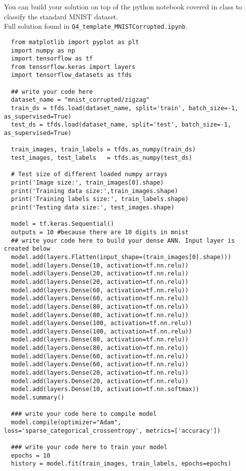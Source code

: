 \item You can build your solution on top of the python notebook covered in class to classify the
standard MNIST dataset.\\[5pt]
Full solution found in \lstinline{Q4_template_MNISTCorrupted.ipynb}.
\begin{lstlisting}
  from matplotlib import pyplot as plt
  import numpy as np
  import tensorflow as tf
  from tensorflow.keras import layers
  import tensorflow_datasets as tfds

  ## write your code here
  dataset_name = "mnist_corrupted/zigzag"
  train_ds = tfds.load(dataset_name, split='train', batch_size=-1, as_supervised=True)
  test_ds = tfds.load(dataset_name, split='test', batch_size=-1, as_supervised=True)

  train_images, train_labels = tfds.as_numpy(train_ds)
  test_images, test_labels   = tfds.as_numpy(test_ds)

  # Test size of different loaded numpy arrays
  print('Image size:', train_images[0].shape)
  print('Training data size:',train_images.shape)
  print('Training labels size:', train_labels.shape)
  print('Testing data size:', test_images.shape)

  model = tf.keras.Sequential()
  outputs = 10 #because there are 10 digits in mnist
  ## write your code here to build your dense ANN. Input layer is created below
  model.add(layers.Flatten(input_shape=(train_images[0].shape)))
  model.add(layers.Dense(10, activation=tf.nn.relu))
  model.add(layers.Dense(20, activation=tf.nn.relu))
  model.add(layers.Dense(20, activation=tf.nn.relu))
  model.add(layers.Dense(60, activation=tf.nn.relu))
  model.add(layers.Dense(60, activation=tf.nn.relu))
  model.add(layers.Dense(80, activation=tf.nn.relu))
  model.add(layers.Dense(80, activation=tf.nn.relu))
  model.add(layers.Dense(100, activation=tf.nn.relu))
  model.add(layers.Dense(100, activation=tf.nn.relu))
  model.add(layers.Dense(80, activation=tf.nn.relu))
  model.add(layers.Dense(80, activation=tf.nn.relu))
  model.add(layers.Dense(60, activation=tf.nn.relu))
  model.add(layers.Dense(60, activation=tf.nn.relu))
  model.add(layers.Dense(20, activation=tf.nn.relu))
  model.add(layers.Dense(20, activation=tf.nn.relu))
  model.add(layers.Dense(10, activation=tf.nn.softmax))
  model.summary()

  ### write your code here to compile model
  model.compile(optimizer="Adam", loss='sparse_categorical_crossentropy', metrics=['accuracy'])

  ### write your code here to train your model
  epochs = 10
  history = model.fit(train_images, train_labels, epochs=epochs)


\end{lstlisting}

